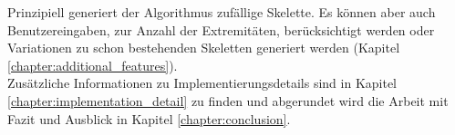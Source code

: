 Prinzipiell generiert der Algorithmus zufällige Skelette. Es können aber auch Benutzereingaben, \zb zur Anzahl der Extremitäten, berücksichtigt werden oder Variationen zu schon bestehenden Skeletten generiert werden (Kapitel \ref{chapter:additional_features}). \\
Zusätzliche Informationen zu Implementierungsdetails sind in Kapitel \ref{chapter:implementation_detail} zu finden und abgerundet wird die Arbeit mit Fazit und Ausblick in Kapitel \ref{chapter:conclusion}.



